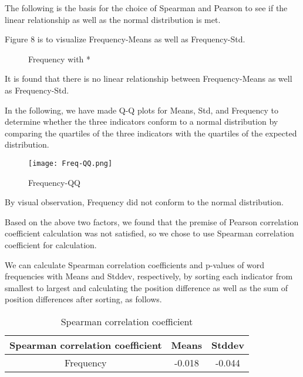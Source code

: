 \documentclass[12pt]{article}  %
\begin{document}
The following is the basis for the choice of Spearman and Pearson to see if the linear relationship as well as the normal distribution is met.

Figure 8 is to visualize Frequency-Means as well as Frequency-Std.

\begin{figure}[H]
	\centering    
	\caption{Frequency with *}		%
	\label{img35}									%
\end{figure}


It is found that there is no linear relationship between Frequency-Means as well as Frequency-Std.

In the following, we have made Q-Q plots for Means, Std, and Frequency to determine whether the three indicators conform to a normal distribution by comparing the quartiles of the three indicators with the quartiles of the expected distribution.

\begin{figure}[H]
	\centering
	\texttt{[image: Freq-QQ.png]}
	\caption{Frequency-QQ}
	\label{img22}
\end{figure}

By visual observation, Frequency did not conform to the normal distribution.

Based on the above two factors, we found that the premise of Pearson correlation coefficient calculation was not satisfied, so we chose to use Spearman correlation coefficient for calculation.

We can calculate Spearman correlation coefficients and p-values of word frequencies with Means and Stddev, respectively, by sorting each indicator from smallest to largest and calculating the position difference as well as the sum of position differences after sorting, as follows.
\begin{table*}
	\centering
	\begin{tabular}{  |c|c|c|
		}
		
		\hline
		Spearman correlation coefficient 	& Means & Stddev \\ 
		\hline
		Frequency	& -0.018  &  -0.044 \\ 
		\hline 
		
	\end{tabular}
	\caption{Spearman correlation coefficient}
	\label{tab:Spearson-f}
\end{table*}
\end{document}
